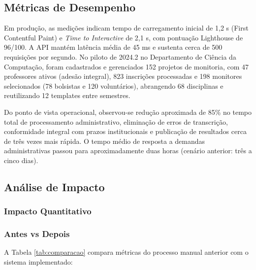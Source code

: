 \documentclass[portuguese]{sbc2025}%
\begin{document}
\subsection{Métricas de Desempenho}

Em produção, as medições indicam tempo de carregamento inicial de 1,2 s (First Contentful Paint) e \textit{Time to Interactive} de 2,1 s, com pontuação Lighthouse de 96/100. A API mantém latência média de 45 ms e sustenta cerca de 500 requisições por segundo. No piloto de 2024.2 no Departamento de Ciência da Computação, foram cadastrados e gerenciados 152 projetos de monitoria, com 47 professores ativos (adesão integral), 823 inscrições processadas e 198 monitores selecionados (78 bolsistas e 120 voluntários), abrangendo 68 disciplinas e reutilizando 12 templates entre semestres.

Do ponto de vista operacional, observou-se redução aproximada de 85\% no tempo total de processamento administrativo, eliminação de erros de transcrição, conformidade integral com prazos institucionais e publicação de resultados cerca de três vezes mais rápida. O tempo médio de resposta a demandas administrativas passou para aproximadamente duas horas (cenário anterior: três a cinco dias).

\subsection{Análise de Impacto}

\subsubsection{Impacto Quantitativo}

\subsubsection{Antes vs Depois}

A Tabela \ref{tab:comparacao} compara métricas do processo manual anterior com o sistema implementado:
\end{document}
